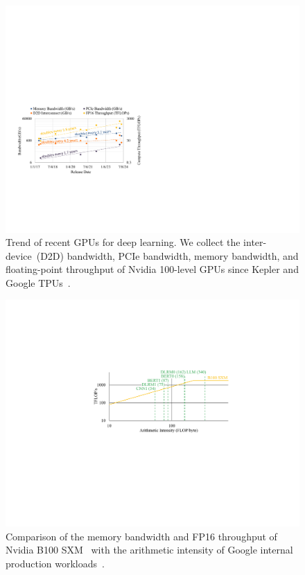 \begin{figure}[]
    \centering
    \includegraphics[width=0.8\linewidth]{figures/Intro/GPUTrendVariousHinted.pdf}
    \caption{Trend of recent GPUs for deep learning. We collect the inter-device~(D2D) bandwidth, PCIe bandwidth, memory bandwidth, and floating-point throughput of Nvidia 100-level GPUs since Kepler and Google TPUs~\cite{epochParameterComputeData,techpowerupGPUSpecsDatabase2024,jouppiTPUV4,timothyprickettmorganLotsQuestionsGoogle2024,smithNVIDIABlackwellArchitecture2024,TensorProcessingUnit2017,jouppiInDatacenterPerformanceAnalysis2017}. }
    \label{fig:gpu_trend_various}
\end{figure}


\begin{figure}[]
    \centering
    \includegraphics[width=0.8\linewidth]{figures/Intro/Roofline.pdf}
    \caption{Comparison of the memory bandwidth and FP16 throughput of Nvidia B100 SXM~\cite{smithNVIDIABlackwellArchitecture2024} with the arithmetic intensity of Google internal production workloads~\cite{jouppiTPUV4}. }
    \label{fig:roofline}
\end{figure}



